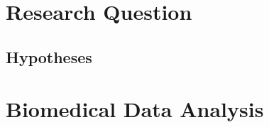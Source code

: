 \documentclass[10pt,a4paper]{article}
\begin{document}
	\section{Research Question}
	
	\subsection{Hypotheses}
	
	 
	
	
	\appendix
	
	\clearpage
	
	\section{Biomedical Data Analysis}
	\label{app:BiomedicalDataAnalysis}
	
	
	
\end{document}
